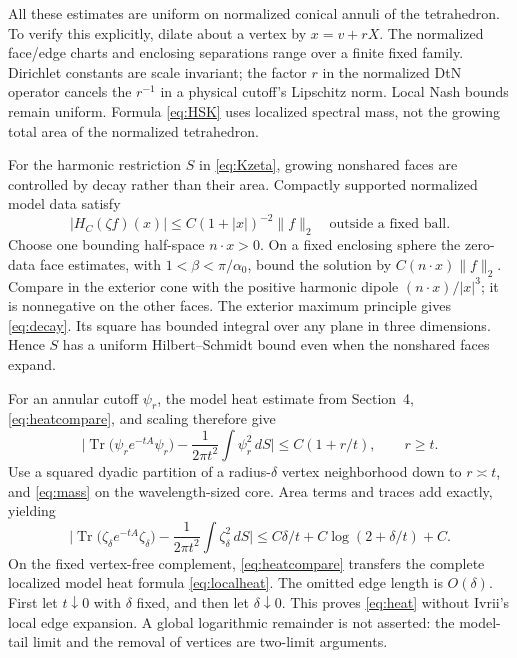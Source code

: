 \documentclass[11pt]{amsart}
\numberwithin{equation}{section}
\theoremstyle{remark}
\newcommand{\Tr}{\operatorname{Tr}}
\begin{document}
All these estimates are uniform on normalized conical annuli of the tetrahedron. To verify this explicitly, dilate about a vertex by $x=v+rX$. The normalized face/edge charts and enclosing separations range over a finite fixed family. Dirichlet constants are scale invariant; the factor $r$ in the normalized DtN operator cancels the $r^{-1}$ in a physical cutoff's Lipschitz norm. Local Nash bounds remain uniform. Formula \eqref{eq:HSK} uses localized spectral mass, not the growing total area of the normalized tetrahedron.

For the harmonic restriction $S$ in \eqref{eq:Kzeta}, growing nonshared faces are controlled by decay rather than their area. Compactly supported normalized model data satisfy
\begin{equation}\label{eq:decay}
|H_C(\zeta f)(x)|\le C(1+|x|)^{-2}\|f\|_2\quad\text{outside a fixed ball.}
\end{equation}
Choose one bounding half-space $n\cdot x>0$. On a fixed enclosing sphere the zero-data face estimates, with $1<\beta<\pi/\alpha_0$, bound the solution by $C(n\cdot x)\|f\|_2$. Compare in the exterior cone with the positive harmonic dipole $(n\cdot x)/|x|^3$; it is nonnegative on the other faces. The exterior maximum principle gives \eqref{eq:decay}. Its square has bounded integral over any plane in three dimensions. Hence $S$ has a uniform Hilbert--Schmidt bound even when the nonshared faces expand.

For an annular cutoff $\psi_r$, the model heat estimate from Section~4, \eqref{eq:heatcompare}, and scaling therefore give
\begin{equation}\label{eq:annulusheat}
\Big|\Tr\big(\psi_re^{-tA}\psi_r\big)-\frac1{2\pi t^2}\int\psi_r^2\,dS\Big|\le C(1+r/t),\qquad r\ge t .
\end{equation}
Use a squared dyadic partition of a radius-$\delta$ vertex neighborhood down to $r\asymp t$, and \eqref{eq:mass} on the wavelength-sized core. Area terms and traces add exactly, yielding
\begin{equation}\label{eq:vertexheat}
\Big|\Tr\big(\zeta_\delta e^{-tA}\zeta_\delta\big)-\frac1{2\pi t^2}\int\zeta_\delta^2\,dS\Big|\le C\delta/t+C\log(2+\delta/t)+C .
\end{equation}
On the fixed vertex-free complement, \eqref{eq:heatcompare} transfers the complete localized model heat formula \eqref{eq:localheat}. The omitted edge length is $O(\delta)$. First let $t\downarrow0$ with $\delta$ fixed, and then let $\delta\downarrow0$. This proves \eqref{eq:heat} without Ivrii's local edge expansion. A global logarithmic remainder is not asserted: the model-tail limit and the removal of vertices are two-limit arguments.
\end{document}
